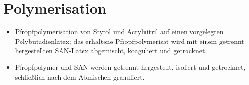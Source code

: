     \section{Polymerisation}
        \begin{itemize}
            \item Pfropfpolymerisation von Styrol und Acrylnitril auf einen vorgelegten Polybutadienlatex; das erhaltene Pfropfpolymerisat
            wird mit einem getrennt hergestellten SAN-Latex abgemischt, koaguliert und getrocknet. \cite{Domininghaus.1998.Kunststoffe.und.ihre.Eigenschaften,Eyerer.2020.Polymer.Engineering.1}
            \item Pfropfpolymer und SAN werden getrennt hergestellt, isoliert und getrocknet, schließlich nach dem Abmischen granuliert. \cite{Domininghaus.1998.Kunststoffe.und.ihre.Eigenschaften,Eyerer.2020.Polymer.Engineering.1}
        \end{itemize}